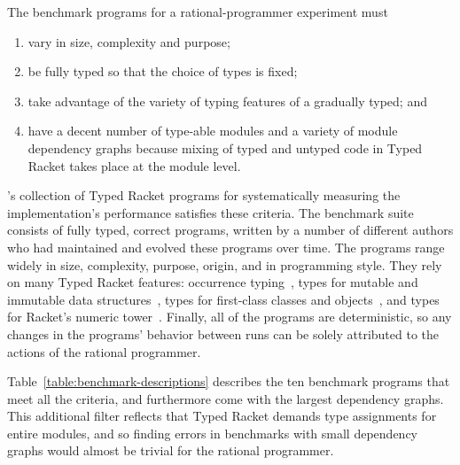 
The benchmark programs for a rational-programmer experiment must 
\begin{enumerate}
   
\item vary in size, complexity and purpose;

\item be fully typed so that the choice of types is fixed; 
    
\item take advantage of the variety of typing features of a gradually
typed; and

\item have a decent number of type-able modules and a variety of module dependency graphs
 because mixing of typed and untyped code in Typed Racket takes place at the
 module level. 

\end{enumerate}

\citet{gtnffvf-jfp-2019}'s collection of Typed Racket programs for
systematically measuring the implementation's performance satisfies these
criteria. The benchmark suite consists of fully typed, correct programs, written
by a number of different authors who had maintained and evolved these programs
over time. The programs range widely in size, complexity, purpose,
origin, and in programming style. They rely on many Typed Racket features:
occurrence typing~\citep{tf-icfp-2010}, types for mutable and immutable data
structures~\citep{hpst-sfp-2010}, types for first-class classes and
objects~\citep{tsdtf-oopsla-2012}, and types for Racket's numeric
tower~\citep{stathff-padl-12}.  Finally, all of the programs are deterministic,
so any changes in the programs' behavior between runs can be solely attributed
to the actions of the rational programmer.



Table~\ref{table:benchmark-descriptions} describes the ten benchmark programs that
meet all the criteria, and furthermore come with the largest dependency graphs.
This additional filter reflects that Typed Racket demands type assignments
for entire modules, and so finding errors in benchmarks with small dependency graphs
would almost be trivial for the rational programmer.
